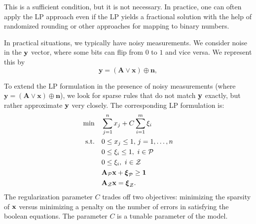 This is a sufficient condition, but it is not necessary. In practice, one can often apply
the LP approach even if the LP yields a fractional solution with the help
of randomized rounding or other approaches for mapping to binary numbers.

In practical situations, we typically have noisy measurements.
We consider noise in the $\mathbf{y}$ vector, where some bits can flip from
$0$ to $1$ and vice versa. We represent this by
\begin{equation}
\label{eq:noisyforwardtest}
	\mathbf{y} = (\mathbf{A} \lor \mathbf{x}) \oplus \mathbf{n},
\end{equation}

To extend the LP formulation in the presence of noisy measurements (where $\mathbf{y} = (\mathbf{A} \lor \mathbf{x}) \oplus \mathbf{n}$), we look
for sparse rules that do not match $\mathbf{y}$ exactly, but rather approximate
$\mathbf{y}$ very closely. The corresponding LP formulation is:
\begin{align}
\label{eq:booleanl1minLPslack}
	\min\quad &\sum_{j=1}^{n} x_j + C\sum_{i=1}^{m}\xi_i\\
	\textrm{s.t.\quad} & 0 \le x_j \le 1,\,j = 1,\ldots,n\nonumber\\
		& 0 \le \xi_i \le 1, ~i \in \mathcal{P} \nonumber\\
		& 0 \le \xi_i, ~i \in \mathcal{Z}\nonumber\\
		& \mathbf{A}_{\mathcal{P}}\mathbf{x} + \boldsymbol{\xi}_{\mathcal{P}} \ge \mathbf{1}\nonumber\\
		& \mathbf{A}_{\mathcal{Z}}\mathbf{x} = \boldsymbol{\xi}_{\mathcal{Z}}.\nonumber
\end{align}
The regularization parameter $C$ trades off two objectives: minimizing the sparsity of $\mathbf{x}$ versus minimizing a penalty on the number of errors in satisfying the boolean equations. The parameter $C$ is a tunable parameter of the model.



